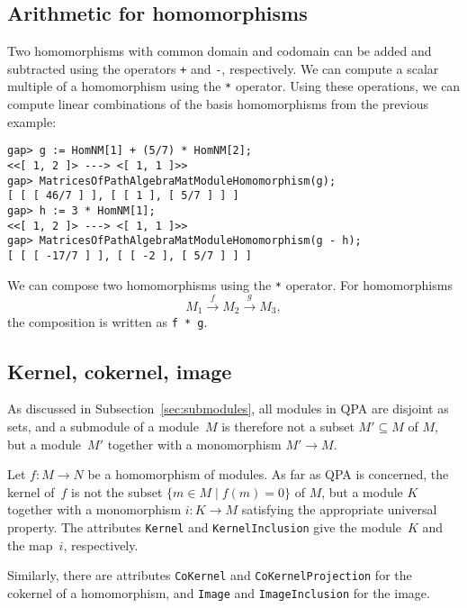 \documentclass{amsart}
\theoremstyle{definition}
\newcommand{\code}[1]{\texttt{#1}}
\theoremstyle{theoretic}
\begin{document}
\subsection{Arithmetic for homomorphisms}

Two homomorphisms with common domain and codomain can be added and
subtracted using the operators \code{+} and \code{-}, respectively.
We can compute a scalar multiple of a homomorphism using the \code{*}
operator.  Using these operations, we can compute linear combinations
of the basis homomorphisms from the previous example:
\begin{verbatim}
gap> g := HomNM[1] + (5/7) * HomNM[2];
<<[ 1, 2 ]> ---> <[ 1, 1 ]>>
gap> MatricesOfPathAlgebraMatModuleHomomorphism(g);
[ [ [ 46/7 ] ], [ [ 1 ], [ 5/7 ] ] ]
gap> h := 3 * HomNM[1];
<<[ 1, 2 ]> ---> <[ 1, 1 ]>>
gap> MatricesOfPathAlgebraMatModuleHomomorphism(g - h);
[ [ [ -17/7 ] ], [ [ -2 ], [ 5/7 ] ] ]
\end{verbatim}

We can compose two homomorphisms using the \code{*} operator.
For homomorphisms
\[
M_1 \xrightarrow{f} M_2 \xrightarrow{g} M_3,
\]
the composition is written as \code{f * g}.

\subsection{Kernel, cokernel, image}

As discussed in Subsection~\ref{sec:submodules}, all modules in QPA
are disjoint as sets, and a submodule of a module~$M$ is therefore not
a subset $M' \subseteq M$ of $M$, but a module~$M'$ together with a
monomorphism $M' \to M$.

Let $f \colon M \to N$ be a homomorphism of modules.  As far as QPA is
concerned, the kernel of~$f$ is not the subset $\{ m \in M \mid f(m) = 0
\}$ of $M$, but a module $K$ together with a monomorphism $i \colon K
\to M$ satisfying the appropriate universal property.  The attributes
\texttt{Kernel} and \texttt{KernelInclusion} give the module~$K$
and the map~$i$, respectively.

Similarly, there are attributes \texttt{CoKernel} and
\texttt{CoKernelProjection} for the cokernel of a homomorphism, and
\texttt{Image} and \texttt{ImageInclusion} for the image.
\end{document}
